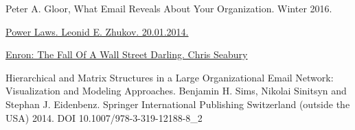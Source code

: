 \begin{thebibliography}{9} 

 Peter A. Gloor, What Email Reveals About Your Organization. Winter 2016. 

 \href	{http://www.leonidzhukov.net/hse/2014/socialnetworks/lectures/lecture2.pdf}{ Power Laws. Leonid E. Zhukov. 20.01.2014.}

 \href{http://www.investopedia.com/articles/stocks/09/enron-collapse.asp}{Enron: The Fall Of A Wall Street Darling. Chris Seabury}

 Hierarchical and Matrix Structures in a Large Organizational Email Network: Visualization and Modeling Approaches. Benjamin H. Sims, Nikolai Sinitsyn and Stephan J. Eidenbenz. Springer International Publishing Switzerland (outside the USA) 2014. DOI 10.1007/978-3-319-12188-8\_2

\end{thebibliography}